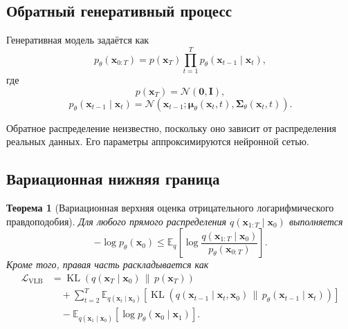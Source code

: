 \documentclass[12pt,a4paper]{article}
\newtheorem{theorem}{Теорема}[section]
\theoremstyle{definition}
\newcommand{\E}{\mathbb{E}}
\newcommand{\N}{\mathcal{N}}
\newcommand{\KL}{\operatorname{KL}}
\newcommand{\1}{\mathbf{1}}
\begin{document}
\subsection{Обратный генеративный процесс}

Генеративная модель задаётся как
\[
    p_\theta(\bm{x}_{0:T})
    =
    p(\bm{x}_T)
    \prod_{t=1}^{T}
    p_\theta(\bm{x}_{t-1}\mid\bm{x}_t),
\]
где
\[
    p(\bm{x}_T)=\N(\bm{0},\bm{I}),
\]
\[
    p_\theta(\bm{x}_{t-1}\mid\bm{x}_t)
    =
    \N\left(
        \bm{x}_{t-1};
        \bm{\mu}_\theta(\bm{x}_t,t),
        \bm{\Sigma}_\theta(\bm{x}_t,t)
    \right).
\]

Обратное распределение неизвестно, поскольку оно зависит от
распределения реальных данных. Его параметры аппроксимируются
нейронной сетью.

\subsection{Вариационная нижняя граница}

\begin{theorem}[Вариационная верхняя оценка отрицательного
логарифмического правдоподобия]
Для любого прямого распределения
$q(\bm{x}_{1:T}\mid\bm{x}_0)$ выполняется
\[
    -\log p_\theta(\bm{x}_0)
    \leq
    \E_q
    \left[
        \log
        \frac{
            q(\bm{x}_{1:T}\mid\bm{x}_0)
        }{
            p_\theta(\bm{x}_{0:T})
        }
    \right].
\]
Кроме того, правая часть раскладывается как
\begin{align*}
    \mathcal{L}_{\mathrm{VLB}}
    &=
    \KL\left(
        q(\bm{x}_T\mid\bm{x}_0)
        \,\|\,p(\bm{x}_T)
    \right)\\
    &\quad+
    \sum_{t=2}^{T}
    \E_{q(\bm{x}_t\mid\bm{x}_0)}
    \left[
        \KL\left(
            q(\bm{x}_{t-1}\mid\bm{x}_t,\bm{x}_0)
            \,\|\,
            p_\theta(\bm{x}_{t-1}\mid\bm{x}_t)
        \right)
    \right]\\
    &\quad-
    \E_{q(\bm{x}_1\mid\bm{x}_0)}
    \left[
        \log p_\theta(\bm{x}_0\mid\bm{x}_1)
    \right].
\end{align*}
\end{theorem}
\end{document}
